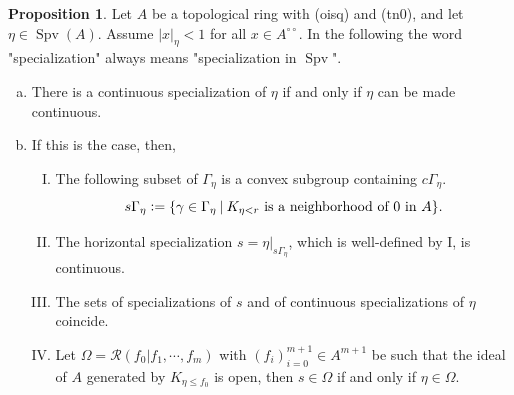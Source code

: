\documentclass[10pt]{article}
\numberwithin{equation}{section}
\theoremstyle{definition}
\newtheorem{proposition}{Proposition}[subsection]
\DeclareMathOperator{\Spv}{Spv}
\newcommand{\defeq}{\vcentcolon=}
\newcommand{\sep}[0]{\:|\:}
\newcommand{\ab}[1]{\vert #1 \vert}
\newcommand{\cGamma}[0]{c\Gamma}
\newcommand{\dcirc}[0]{{\circ\circ}}
\begin{document}
\begin{proposition}
    \label{proposition_13_3}
    Let $A$ be a topological ring with (oisq) and (tn0), and let $\eta\in\Spv(A)$. Assume $\ab{x}_\eta<1$ for all $x\in A^{\dcirc}$. In the following the word "specialization" always means "specialization in $\Spv$".
    \begin{enumerate}[a.]
        \item There is a continuous specialization of $\eta$ if and only if $\eta$ can be made continuous.
        \item If this is the case, then,
            \begin{enumerate}[I.]
                \item The following subset of $\Gamma_\eta$ is a convex subgroup containing $\cGamma_\eta$.
                \begin{equation*}
                    s\Gamma_\eta \defeq \{\gamma\in\Gamma_\eta\sep K_{\eta<r}\text{ is a neighborhood of $0$ in $A$}\}.
                \end{equation*}
                \item The horizontal specialization $s=\eta|_{s\Gamma_\eta}$, which is well-defined by I, is continuous.
                \item The sets of specializations of $s$ and of continuous specializations of $\eta$ coincide.
                \item Let $\Omega=\mathcal{R}(f_0|f_1,\cdots,f_m)$ with $(f_i)_{i=0}^{m+1}\in A^{m+1}$ be such that the ideal of $A$ generated by $K_{\eta\leq f_0}$ is open, then $s\in\Omega$ if and only if $\eta\in\Omega$.
            \end{enumerate}
    \end{enumerate}
\end{proposition}
\end{document}
